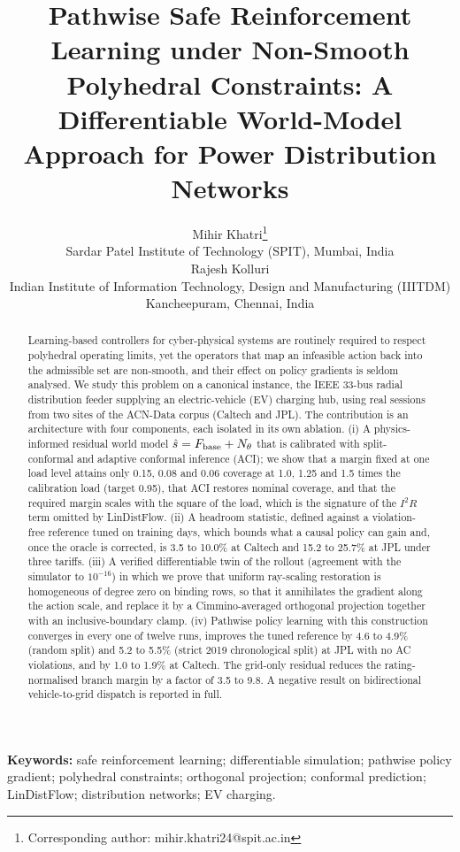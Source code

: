 \documentclass[11pt]{article}
\title{Pathwise Safe Reinforcement Learning under Non-Smooth Polyhedral Constraints: A Differentiable World-Model Approach for Power Distribution Networks}
\author{Mihir Khatri\thanks{Corresponding author: mihir.khatri24@spit.ac.in}\\ \small Sardar Patel Institute of Technology (SPIT), Mumbai, India\\[4pt]
Rajesh Kolluri\\ \small Indian Institute of Information Technology, Design and Manufacturing (IIITDM) Kancheepuram, Chennai, India}
\date{}
\begin{document}
\maketitle

\begin{abstract}
Learning-based controllers for cyber-physical systems are routinely required to respect polyhedral operating limits, yet the operators that map an infeasible action back into the admissible set are non-smooth, and their effect on policy gradients is seldom analysed. We study this problem on a canonical instance, the IEEE 33-bus radial distribution feeder supplying an electric-vehicle (EV) charging hub, using real sessions from two sites of the ACN-Data corpus (Caltech and JPL). The contribution is an architecture with four components, each isolated in its own ablation. (i) A physics-informed residual world model $\hat s=F_{\rm base}+N_\theta$ that is calibrated with split-conformal and adaptive conformal inference (ACI); we show that a margin fixed at one load level attains only 0.15, 0.08 and 0.06 coverage at 1.0, 1.25 and 1.5 times the calibration load (target 0.95), that ACI restores nominal coverage, and that the required margin scales with the square of the load, which is the signature of the $I^2R$ term omitted by LinDistFlow. (ii) A headroom statistic, defined against a violation-free reference tuned on training days, which bounds what a causal policy can gain and, once the oracle is corrected, is 3.5 to 10.0\% at Caltech and 15.2 to 25.7\% at JPL under three tariffs. (iii) A verified differentiable twin of the rollout (agreement with the simulator to $10^{-16}$) in which we prove that uniform ray-scaling restoration is homogeneous of degree zero on binding rows, so that it annihilates the gradient along the action scale, and replace it by a Cimmino-averaged orthogonal projection together with an inclusive-boundary clamp. (iv) Pathwise policy learning with this construction converges in every one of twelve runs, improves the tuned reference by 4.6 to 4.9\% (random split) and 5.2 to 5.5\% (strict 2019 chronological split) at JPL with no AC violations, and by 1.0 to 1.9\% at Caltech. The grid-only residual reduces the rating-normalised branch margin by a factor of 3.5 to 9.8. A negative result on bidirectional vehicle-to-grid dispatch is reported in full.
\end{abstract}
\textbf{Keywords:} safe reinforcement learning; differentiable simulation; pathwise policy gradient; polyhedral constraints; orthogonal projection; conformal prediction; LinDistFlow; distribution networks; EV charging.
\end{document}
